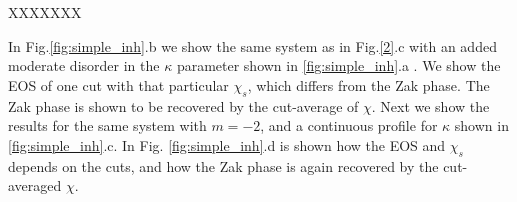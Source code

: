 \documentclass[twocolumn,amsmath,longbibliography,amssymb,superscriptaddress]{revtex4-1}
\begin{document}
XXXXXXX



In Fig.\ref{fig:simple_inh}.b we show the same system as in Fig.\ref{2}.c with an added moderate disorder in the $\kappa$ parameter shown in \ref{fig:simple_inh}.a . We show the EOS of one cut with that particular $\chi_s$, which differs from the Zak phase. The Zak phase is shown to be recovered by the cut-average of $\chi$. Next we show the results for the same system with $m=-2$, and a continuous profile for $\kappa$ shown in \ref{fig:simple_inh}.c. In Fig. \ref{fig:simple_inh}.d is shown how the EOS and $\chi_s$ depends on the cuts, and how the Zak phase is again recovered by the cut-averaged $\chi$.

\begin{figure}[h!]
\centering
{}\hspace{0mm}

\hspace{0mm}


\end{figure}
\end{document}
